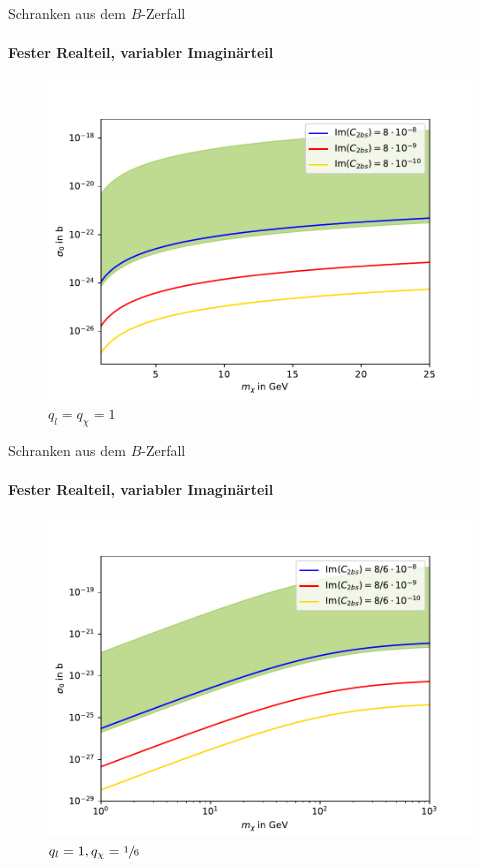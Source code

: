 \begin{frame}{Schranken aus dem $B$-Zerfall}
\framesubtitle{Fester Realteil, variabler Imaginärteil}
	\begin{figure}
		\centering
		\includegraphics[width=.8\textwidth]{Bilder/Im11.pdf}
		\caption{$q_l=q_\chi=1$}
	\end{figure}
\end{frame}
\begin{frame}[noframenumbering]{Schranken aus dem $B$-Zerfall}
\framesubtitle{Fester Realteil, variabler Imaginärteil}
	\begin{figure}
		\centering
		\includegraphics[width=.8\textwidth]{Bilder/Im116.pdf}
		\caption{$q_l=1,q_\chi=\sfrac{1}{6}$}
	\end{figure}
\end{frame}


